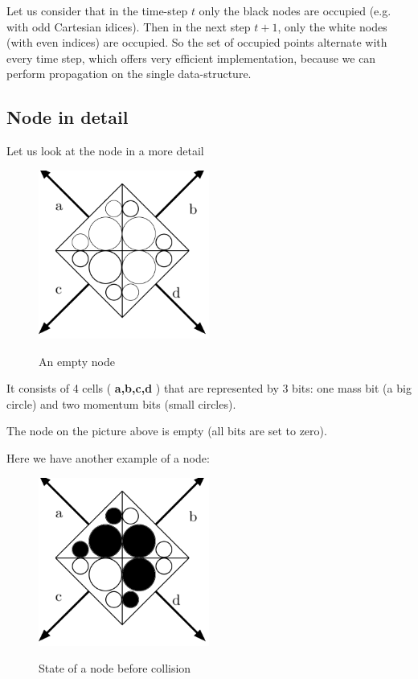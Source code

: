 Let us consider that in the time-step $t$ only the black nodes are occupied (e.g. with odd Cartesian idices). Then in the next step $t+1$, only the white nodes (with even indices) are occupied. 
So the set of occupied points alternate with every time step, which offers very efficient implementation, because we can perform propagation on the single data-structure.

\bigskip

\subsection{Node in detail}

Let us look at the node in a more detail
\begin{figure}[H]
 \centering 
 \includegraphics[width=0.5\textwidth]{./img/node_empty}
 \label{empty}
 \caption{An empty node}
\end{figure}

\newpage
It consists of 4 cells ( \textbf{a,b,c,d} ) that are represented by 3 bits:
one mass bit (a big circle) and two momentum bits (small circles).

The node on the picture above is empty (all bits are set to zero).

Here we have another example of a node:
\begin{figure}[htbp]
 \centering 
 \includegraphics[width=0.5\textwidth]{./img/node_1}
 \label{pre_collision}
 \caption{State of a node before collision}
\end{figure}

